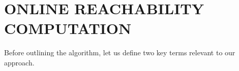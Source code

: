 \documentclass[manuscript,screen,review]{acmart}
\newcommand{\nate}[1]{\textcolor{magenta}{\textbf{\underline{Nate:}} #1}}
\begin{document}



\section{ONLINE REACHABILITY COMPUTATION}

Before outlining the algorithm, let us define two key terms relevant to our approach.\smallskip
\end{document}
